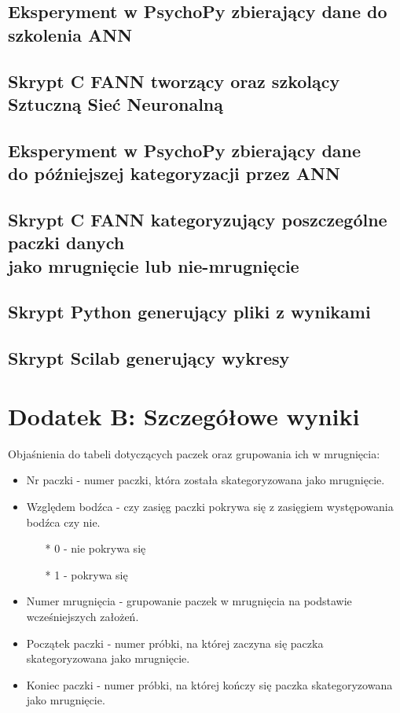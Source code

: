 \documentclass{article}
\begin{document}
        \subsection*{Eksperyment w PsychoPy zbierający dane do szkolenia ANN}
        \subsection*{Skrypt C FANN tworzący oraz szkolący \\Sztuczną Sieć Neuronalną}
        \subsection{Eksperyment w PsychoPy zbierający dane \\do późniejszej kategoryzacji przez ANN}
        \subsection{Skrypt C FANN kategoryzujący poszczególne paczki danych \\jako mrugnięcie lub nie-mrugnięcie}
        \subsection{Skrypt Python generujący pliki z wynikami}
        \subsection{Skrypt Scilab generujący wykresy}

    \newpage
    \section*{Dodatek B: Szczegółowe wyniki}

        Objaśnienia do tabeli dotyczących paczek oraz grupowania ich w mrugnięcia: 
        \begin{itemize}
            \item Nr paczki - numer paczki, która została skategoryzowana jako mrugnięcie.
            \item Względem bodźca - czy zasięg paczki pokrywa się z zasięgiem występowania bodźca czy nie. 
            \begin{itemize}
                \item[*] 0 - nie pokrywa się\
                \item[*] 1 - pokrywa się\
            \end{itemize}
            \item Numer mrugnięcia - grupowanie paczek w mrugnięcia na podstawie wcześniejszych założeń.
            \item Początek paczki - numer próbki, na której zaczyna się paczka skategoryzowana jako mrugnięcie.
            \item Koniec paczki - numer próbki, na której kończy się paczka skategoryzowana jako mrugnięcie. 
        \end{itemize}
\end{document}
